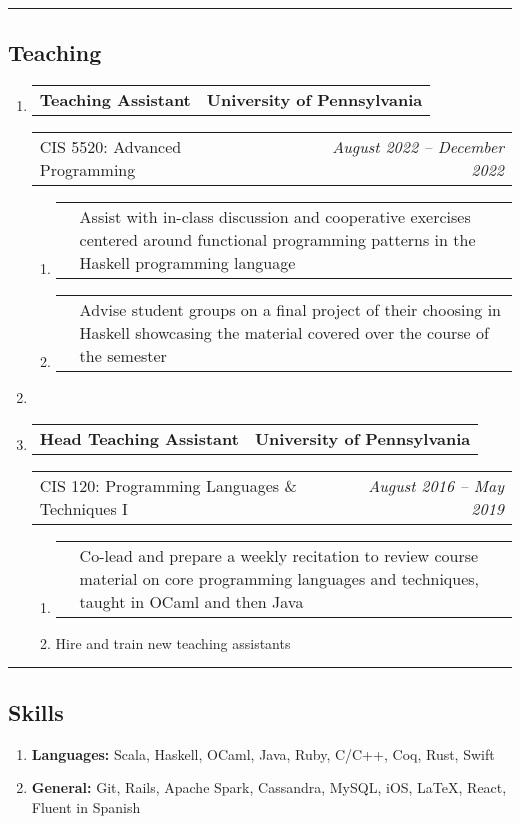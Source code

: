 \documentclass[letterpaper]{article}
\makeatletter
\newcommand*{\tabulardef}[3]{\begin{tabular}[t]{@{}lp{\dimexpr\linewidth-#1}@{}}
    #2&#3
\end{tabular}}
\newcommand{\headerrow}[2]
{\begin{tabular*}{\linewidth}{l@{\extracolsep{\fill}}r}
	#1 &
	#2 \\
\end{tabular*}}
\makeatother
\begin{document}
\hrule
\vspace{-0.6em}
\subsection*{Teaching}
\begin{enumerate}[label=]
	\parskip=-0.25em

	\item
		\headerrow
			{\textbf{Teaching Assistant}}
			{\textbf{University of Pennsylvania}}
	\headerrow
		{CIS 5520: Advanced Programming}
		{\emph{August 2022 -- December 2022}}
	\begin{enumerate}[label= *]
		\parskip=-0.1em
        \item\tabulardef{5cm}{}{Assist with in-class discussion and cooperative exercises centered around functional programming patterns in the Haskell programming language}        
        \item\tabulardef{5cm}{}{Advise student groups on a final project of their choosing in Haskell showcasing the material covered over the course of the semester}
	\end{enumerate}

     \item

	\item
		\headerrow
			{\textbf{Head Teaching Assistant}}
			{\textbf{University of Pennsylvania}}
	\headerrow
		{CIS 120: Programming Languages \& Techniques I}
		{\emph{August 2016 -- May 2019}}
	\begin{enumerate}[label= *]
		\parskip=-0.1em
        \item\tabulardef{5cm}{}{Co-lead and prepare a weekly recitation to review course material on core programming languages and techniques, taught in OCaml and then Java}
		\item Hire and train new teaching assistants
	\end{enumerate}
\end{enumerate}

\hrule
\vspace{-0.6em}
\subsection*{Skills}
\begin{enumerate}[label=]
	\parskip=-0.25em

	\item
	\textbf{Languages: } Scala, Haskell, OCaml, Java, Ruby, C/C++, Coq, Rust, Swift

	\item
	\textbf{General: } Git, Rails, Apache Spark, Cassandra, MySQL, iOS, \LaTeX, React, Fluent in Spanish

\end{enumerate}
\end{document}
